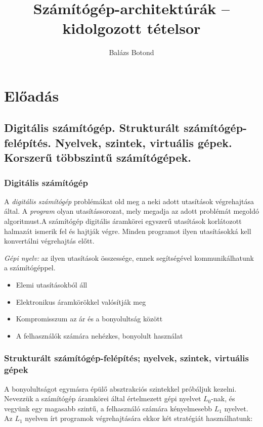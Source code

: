 \documentclass[a4paper]{article}
\title{Számítógép-architektúrák -- kidolgozott tételsor}
\author{Balázs Botond}
\begin{document}
\maketitle

\section{Előadás}

\subsection{Digitális számítógép. Strukturált számítógép-felépítés. Nyelvek, szintek, virtuális gépek. Korszerű többszintű számítógépek.}

\subsubsection{Digitális számítógép}

A \emph{digitális számítógép} problémákat old meg a neki adott utasítások végrehajtása által. A \textit{program} olyan utasítássorozat, mely megadja az adott problémát megoldó algoritmust.A számítógép digitális áramkörei egyszerű utasítások korlátozott halmazát ismerik fel és hajtják végre. Minden programot ilyen utasításokká kell konvertálni végrehajtás előtt.

\textit{Gépi nyelv:} az ilyen utasítások összessége, ennek segítségével kommunikálhatunk a számítógéppel.

\begin{itemize}
	\item Elemi utasításokból áll
	\item Elektronikus áramkörökkel valósítják meg
	\item Kompromisszum az ár és a bonyolultság között
	\item A felhasználók számára nehézkes, bonyolult használat
\end{itemize}

\subsubsection{Strukturált számítógép-felépítés; nyelvek, szintek, virtuális gépek}

A bonyolultságot egymásra épülő absztrakciós szintekkel próbáljuk kezelni. Nevezzük a számítógép áramkörei által értelmezett gépi nyelvet $L_0$-nak, és vegyünk egy magasabb szintű, a felhasználó számára kényelmesebb $L_1$ nyelvet. Az $L_1$ nyelven írt programok végrehajtására ekkor két stratégiát használhatunk:
\end{document}
